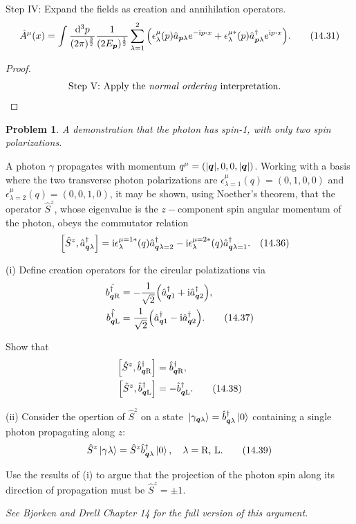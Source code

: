 \documentclass[letterpaper]{article}
\theoremstyle{definition}
\newtheorem{prob}{Problem}[section]
\begin{document}
Step IV: Expand the fields as creation and annihilation operators.\[\hat{A}^\mu(x)=\int\frac{\dd[3]{p}}{(2\pi)^{\frac{3}{2}}}\frac{1}{(2E_{\vb*{p}})^\frac{1}{2}}\sum^2_{\lambda=1}\pqty{\epsilon^\mu_\lambda(p)\hat{a}_{\vb*{p}\lambda}e^{-\text{i}p\vdot x}+\epsilon^{\mu*}_\lambda(p)\hat{a}^\dagger_{\vb*{p}\lambda}e^{\text{i}p\vdot x}}.\qquad(14.31)\]

\begin{proof}
  \begin{align*}
    \qq*{Step V: Apply the \emph{normal ordering} interpretation.} \\
  \end{align*}

\end{proof}



\begin{prob}
  \emph{A demonstration that the photon has spin-1, with only two spin polarizations.}

  A photon \(\gamma\) propagates with momentum \(q^\mu=(|\vb*{q}|,0,0,|\vb*{q}|)\). Working with a basis where the two transverse photon polarizations are \(\epsilon^\mu_{\lambda=1}(q)=(0,1,0,0)\) and \(\epsilon^\mu_{\lambda=2}(q)=(0,0,1,0)\), it may be shown, using Noether's theorem, that the operator \(\hat{S}^z\), whose eigenvalue is the \(z-\)component spin angular momentum of the photon, obeys the commutator relation \[\bqty{\hat{S}^z,\hat{a}^\dagger_{\vb*{q}\lambda}}=\text{i}\epsilon^{\mu=1*}_\lambda(q)\hat{a}^\dagger_{\vb*{q}\lambda=2}-\text{i}\epsilon^{\mu=2*}_\lambda(q)\hat{a}^\dagger_{\vb*{q}\lambda=1}.\qq{(14.36)}\]

  (i) Define creation operators for the circular polatizations via
  \begin{align*}\hat{b^\dagger_{\vb*{q}\text{R}}} & =-\frac{1}{\sqrt{2}}\pqty{\hat{a}^\dagger_{\vb*{q}1}+\text{i}\hat{a}^\dagger_{\vb*{q}2}},             \\
    \hat{b^\dagger_{\vb*{q}\text{L}}} & =\frac{1}{\sqrt{2}}\pqty{\hat{a}^\dagger_{\vb*{q}1}-\text{i}\hat{a}^\dagger_{\vb*{q}2}}.\qquad(14.37)
  \end{align*}


  Show that\begin{align*}\bqty{\hat{S}^z,\hat{b}^\dagger_{\vb*{q}\text{R}}}&=\hat{b}^\dagger_{\vb*{q}\text{R}},\\\bqty{\hat{S}^z,\hat{b}^\dagger_{\vb*{q}\text{L}}}&=-\hat{b}^\dagger_{\vb*{q}\text{L}}.\qquad(14.38)\end{align*}

  (ii) Consider the opertion of \(\hat{S}^z\) on a state \(\ket*{\gamma_{\vb*{q}\lambda}}=\hat{b}^\dagger_{\vb*{q}\lambda}\ket*{0}\) containing a single photon propagating along \(z\):\[\hat{S}^z\ket*{\gamma\lambda}=\hat{S}^z\hat{b}^\dagger_{\vb*{q}\lambda}\ket*{0}\qcomma\lambda=\text{R, L.}\qquad(14.39)\]

  Use the results of (i) to argue that the projection of the photon spin along its direction of propagation must be \(\hat{S}^z=\pm 1.\)

  \emph{See Bjorken and Drell Chapter 14 for the full version of this argument.}
\end{prob}
\end{document}

